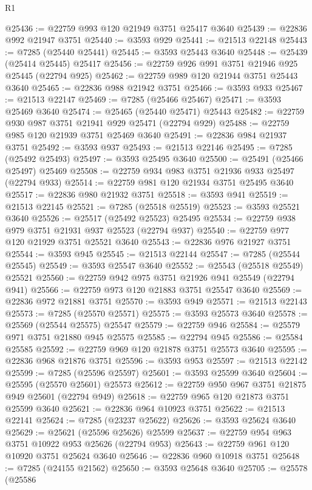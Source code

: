 \begin{lexlean}{R1}
\begin{coremodule}
@25436 := @22759 @993 @120 @21949 @3751 @25417 @3640
@25439 := @22836 @992 @21947 @3751
@25440 := @3593 @929
@25441 := @21513 @22148
@25443 := @7285 (@25440 @25441)
@25445 := @3593 @25443 @3640
@25448 := @25439 (@25414 @25445) @25417
@25456 := @22759 @926 @991 @3751 @21946 @925 @25445 (@22794 @925)
@25462 := @22759 @989 @120 @21944 @3751 @25443 @3640
@25465 := @22836 @988 @21942 @3751
@25466 := @3593 @933
@25467 := @21513 @22147
@25469 := @7285 (@25466 @25467)
@25471 := @3593 @25469 @3640
@25474 := @25465 (@25440 @25471) @25443
@25482 := @22759 @930 @987 @3751 @21941 @929 @25471 (@22794 @929)
@25488 := @22759 @985 @120 @21939 @3751 @25469 @3640
@25491 := @22836 @984 @21937 @3751
@25492 := @3593 @937
@25493 := @21513 @22146
@25495 := @7285 (@25492 @25493)
@25497 := @3593 @25495 @3640
@25500 := @25491 (@25466 @25497) @25469
@25508 := @22759 @934 @983 @3751 @21936 @933 @25497 (@22794 @933)
@25514 := @22759 @981 @120 @21934 @3751 @25495 @3640
@25517 := @22836 @980 @21932 @3751
@25518 := @3593 @941
@25519 := @21513 @22145
@25521 := @7285 (@25518 @25519)
@25523 := @3593 @25521 @3640
@25526 := @25517 (@25492 @25523) @25495
@25534 := @22759 @938 @979 @3751 @21931 @937 @25523 (@22794 @937)
@25540 := @22759 @977 @120 @21929 @3751 @25521 @3640
@25543 := @22836 @976 @21927 @3751
@25544 := @3593 @945
@25545 := @21513 @22144
@25547 := @7285 (@25544 @25545)
@25549 := @3593 @25547 @3640
@25552 := @25543 (@25518 @25549) @25521
@25560 := @22759 @942 @975 @3751 @21926 @941 @25549 (@22794 @941)
@25566 := @22759 @973 @120 @21883 @3751 @25547 @3640
@25569 := @22836 @972 @21881 @3751
@25570 := @3593 @949
@25571 := @21513 @22143
@25573 := @7285 (@25570 @25571)
@25575 := @3593 @25573 @3640
@25578 := @25569 (@25544 @25575) @25547
@25579 := @22759 @946
@25584 := @25579 @971 @3751 @21880 @945 @25575
@25585 := @22794 @945
@25586 := @25584 @25585
@25592 := @22759 @969 @120 @21878 @3751 @25573 @3640
@25595 := @22836 @968 @21876 @3751
@25596 := @3593 @953
@25597 := @21513 @22142
@25599 := @7285 (@25596 @25597)
@25601 := @3593 @25599 @3640
@25604 := @25595 (@25570 @25601) @25573
@25612 := @22759 @950 @967 @3751 @21875 @949 @25601 (@22794 @949)
@25618 := @22759 @965 @120 @21873 @3751 @25599 @3640
@25621 := @22836 @964 @10923 @3751
@25622 := @21513 @22141
@25624 := @7285 (@23237 @25622)
@25626 := @3593 @25624 @3640
@25629 := @25621 (@25596 @25626) @25599
@25637 := @22759 @954 @963 @3751 @10922 @953 @25626 (@22794 @953)
@25643 := @22759 @961 @120 @10920 @3751 @25624 @3640
@25646 := @22836 @960 @10918 @3751
@25648 := @7285 (@24155 @21562)
@25650 := @3593 @25648 @3640
@25705 := @25578
    (@25586

\end{coremodule}
\end{lexlean}
